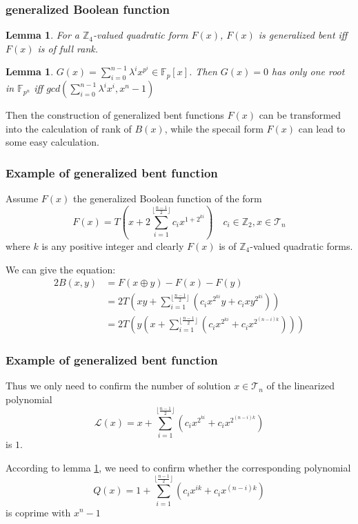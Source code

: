 \documentclass[
    aspectratio=169,                   %
]{beamer}
\renewcommand{\Bbb}{\mathbb}
\newcommand{\Z}{\mathbb{Z}}
\newtheorem{lem}[thm]{Lemma}
\begin{document}
    \begin{frame}
        \frametitle{generalized Boolean function}
    
        \begin{lem}
            For a $ \Z_4 $-valued quadratic form $ F(x) $, $ F(x) $ is generalized bent iff $ F(x) $ is of full rank.
        \end{lem}
        \begin{lem}\label{linearizedpoly}
            $ G(x)=\sum_{i=0}^{n-1}\lambda^ix^{p^i}\in\Bbb F_p[x] $. Then $ G(x)=0 $ has only one root in $ \Bbb F_{p^n} $ iff $ gcd(\sum_{i=0}^{n-1}\lambda^ix^i,x^n-1) $
        \end{lem}
        Then the construction of generalized bent functions $ F(x) $ can be transformed into the calculation of rank of $ B(x) $, while the specail form $ F(x) $ can lead to some easy calculation.
    
    \end{frame}
    \begin{frame}
        \frametitle{Example of generalized bent function}
    
        Assume $ F(x) $ the generalized Boolean function of the form
        \[F(x)=T\left( x+2\sum_{i=1}^{\lfloor\frac{n-1}{2}\rfloor}c_ix^{1+2^{ki}} \right)\quad c_i\in\Z_2,x\in\mathcal{T}_n\]
        where $ k $ is any positive integer and clearly $ F(x) $ is of $ \Z_4 $-valued quadratic forms.
        
        We can give the equation:
        \begin{align*}
            2B(x,y)&=F(x\oplus y)-F(x)-F(y)\\
            &=2T\left( xy+\sum_{i=1}^{\lfloor\frac{n-1}{2}\rfloor}\left(c_ix^{2^{ki}}y+c_ixy^{2^{ki}}\right)\right)\\
            &=2T\left( y\left(x+\sum_{i=1}^{\lfloor\frac{n-1}{2}\rfloor}\left(c_ix^{2^{ki}}+c_ix^{2^{(n-i)k}}\right)\right)\right)
        \end{align*}
    
    \end{frame}
    \begin{frame}
        \frametitle{Example of generalized bent function}
    
        Thus we only need to confirm the number of solution $ x\in\mathcal{T}_n $ of the linearized polynomial 
        \[ \mathcal{L}(x)=x+\sum_{i=1}^{\lfloor\frac{n-1}{2}\rfloor}\left(c_ix^{2^{ki}}+c_ix^{2^{(n-i)k}}\right) \]
        is $ 1 $.

        According to lemma \ref{linearizedpoly}, we need to confirm whether the corresponding polynomial 
        \[Q(x)=1+\sum_{i=1}^{\lfloor\frac{n-1}{2}\rfloor}\left(c_ix^{{ik}}+c_ix^{{(n-i)k}}\right)\]
        is coprime with $ x^n-1 $
    
    \end{frame}
\end{document}
